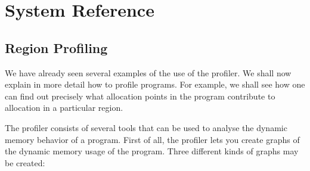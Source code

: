 \documentclass[12pt]{book}
\begin{document}
\part{System Reference}

\chapter{Region Profiling}
\label{useOfProf.sec}
We have already seen several examples of the use of the profiler. We
shall now explain in more detail how to profile programs. For example, we shall see
how one can find out precisely what allocation points in the program
contribute to allocation in a particular region.

The profiler consists of several tools that can be used to analyse the
dynamic memory behavior of a program. First of all, the profiler lets
you create graphs of the dynamic memory usage of the program. Three
different kinds of graphs may be created:
\end{document}
